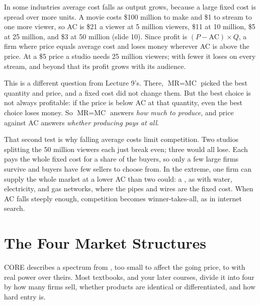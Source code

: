 \documentclass[11pt]{article}
\begin{document}
 In some industries average cost falls as output grows, because a large fixed cost is spread over more units. A movie costs \$100 million to make and \$1 to stream to one more viewer, so AC is \$21 a viewer at 5 million viewers, \$11 at 10 million, \$5 at 25 million, and \$3 at 50 million (slide 10). Since profit is $(P - \text{AC}) \times Q$, a firm  where price equals average cost and loses money wherever AC is above the price. At a \$5 price a studio needs 25 million viewers; with fewer it loses on every stream, and beyond that its profit grows with its audience.

This is a different question from Lecture 9's. There, $\text{MR} = \text{MC}$ picked the best quantity and price, and a fixed cost did not change them. But the best choice is not always profitable: if the price is below AC at that quantity, even the best choice loses money. So $\text{MR} = \text{MC}$ answers \emph{how much to produce}, and price against AC answers \emph{whether producing pays at all}.

That second test is why falling average costs limit competition. Two studios splitting the 50 million viewers each just break even; three would all lose. Each pays the whole fixed cost for a share of the buyers, so only a few large firms survive and buyers have few sellers to choose from. In the extreme, one firm can supply the whole market at a lower AC than two could: a , as with water, electricity, and gas networks, where the pipes and wires are the fixed cost. When AC falls steeply enough, competition becomes winner-takes-all, as in internet search.

\section{The Four Market Structures}

CORE describes a spectrum from , too small to affect the going price, to  with real power over theirs. Most textbooks, and your later courses, divide it into four  by how many firms sell, whether products are identical or differentiated, and how hard entry is.
\end{document}
